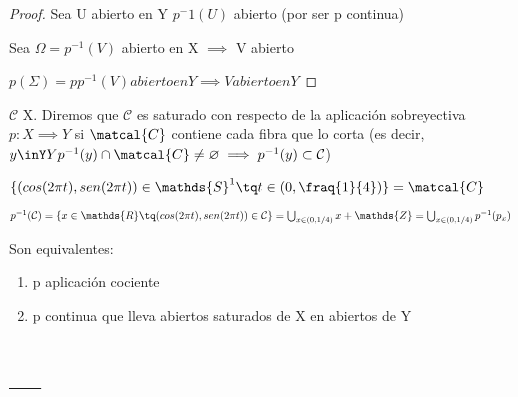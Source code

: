 \documentclass[palatino]{apuntes}
\begin{document}
\begin{proof}
Sea U abierto en Y \implies $p^-1(U)$ abierto (por ser p continua)

Sea $\Omega = p^{-1}(V)$ abierto en X $\implies$ V abierto

$p(\Sigma) = pp^{-1}(V) abierto en Y \implies V abierto en Y$
\end{proof}



\begin{defn}
$\mathcal{C}$ \subset X. Diremos que $\mathcal{C}$ es saturado con respecto de la aplicación sobreyectiva $p: X\implies Y$ si $\matcal{C}$ contiene cada fibra que lo corta (es decir, $y\inY Y p^{-1}(y)\cap\matcal{C} \neq \varnothing \implies p^{-1}(y) \subset \mathcal{C} $)
\end{defn}


\begin{example}
$\{(cos(2\pi t), sen (2\pi t)) \in \mathds{S}^1 \tq t \in (0, \fraq{1}{4}) \} = \matcal{C}$

$p^{-1}(\mathcal{C}) = \{ x \in \mathds{R} \tq (cos(2\pi t), sen (2\pi t)) \in \mathcal{C} \} = \bigcup_{x\in(0,1/4)}x + \mathds{Z}  = \bigcup_{x\in(0,1/4)} p^{-1}(p_x) $
\end{example}


\begin{thm}
Son equivalentes:
\begin{enumerate}
	\item p aplicación cociente
	\item p continua que lleva abiertos saturados de X en abiertos de Y
\end{enumerate}
\end{thm}

























\appendix

\chapter{---}


\printindex
\end{document}
